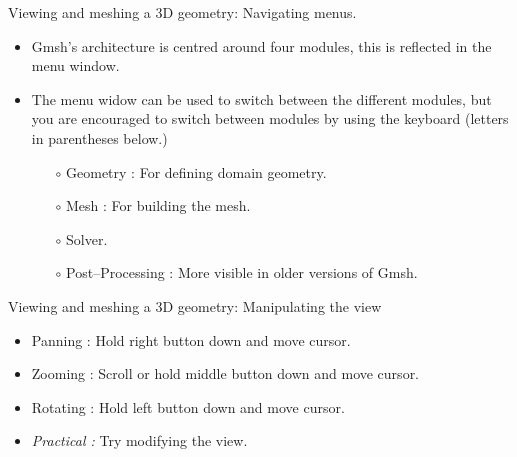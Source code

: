 \documentclass[t]{beamer}
\begin{document}
\begin{frame}{Viewing and meshing a 3D geometry: Navigating menus.}
   \begin{itemize}
     \item Gmsh's architecture is centred around four modules, this is reflected in the menu window.\\[10pt]
     \item The menu widow can be used to switch between the different modules, but you are encouraged to switch between modules by using the keyboard (letters in parentheses below.)\\[10pt]
     \begin{itemize}
       \item[$\circ$] Geometry : For defining domain geometry.
       \item[$\circ$] Mesh : For building the mesh.
       \item[$\circ$] Solver.
       \item[$\circ$] Post--Processing : More visible in older versions of Gmsh.
     \end{itemize}
   \end{itemize}
\end{frame}

\begin{frame}{Viewing and meshing a 3D geometry: Manipulating the view}
\begin{itemize}
\item Panning : Hold right button down and move cursor.
\item Zooming : Scroll or hold middle button down and move cursor.
\item Rotating : Hold left button down and move cursor.
\item \emph{Practical :} Try modifying the view.
\end{itemize}
\end{frame}
\end{document}
